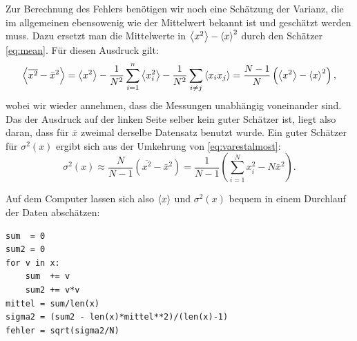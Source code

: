 Zur Berechnung des Fehlers benötigen wir noch eine Schätzung der
Varianz, die im allgemeinen ebensowenig wie der Mittelwert bekannt ist
und geschätzt werden muss. Dazu ersetzt man die Mittelwerte in
$\left\langle{x^2}\right\rangle - \left\langle{x}\right\rangle^2$ durch den Schätzer \eqref{eq:mean}. Für
diesen Ausdruck gilt:
\begin{equation}
  \label{eq:varestalmost}
  \left\langle{\overline{x^2} - \bar{x}^2}\right\rangle
  = \left\langle{x^2}\right\rangle - 
  \frac{1}{N^2}\sum_{i=1}^n \left\langle{x_i^2}\right\rangle
  - \frac{1}{N^2}\sum_{i\neq j} \left\langle{x_ix_j}\right\rangle
  = \frac{N-1}{N}\left(\left\langle{x^2}\right\rangle - \left\langle{x}\right\rangle^2\right),
\end{equation}
wobei wir wieder annehmen, dass die Messungen unabhängig voneinander
sind. Das der Ausdruck auf der linken Seite selber kein guter
Schätzer ist, liegt also daran, dass für $\bar{x}$ zweimal derselbe
Datensatz benutzt wurde. Ein guter Schätzer für $\sigma^2(x)$ ergibt
sich aus der Umkehrung von \eqref{eq:varestalmost}:
\begin{equation}
  \label{eq:varest}
  \sigma^2(x) \approx \frac{N}{N-1}\left(\overline{x^2} - \bar{x}^2\right)
  = \frac{1}{N-1} \left(\sum_{i=1}^N x_i^2 - N\bar{x}^2\right).
\end{equation}

Auf dem Computer lassen sich also $\left\langle{x}\right\rangle$ und $\sigma^2(x)$ bequem in
einem Durchlauf der Daten abschätzen:
\begin{lstlisting}
sum  = 0
sum2 = 0
for v in x:
    sum  += v
    sum2 += v*v
mittel = sum/len(x)
sigma2 = (sum2 - len(x)*mittel**2)/(len(x)-1)
fehler = sqrt(sigma2/N)
\end{lstlisting}

